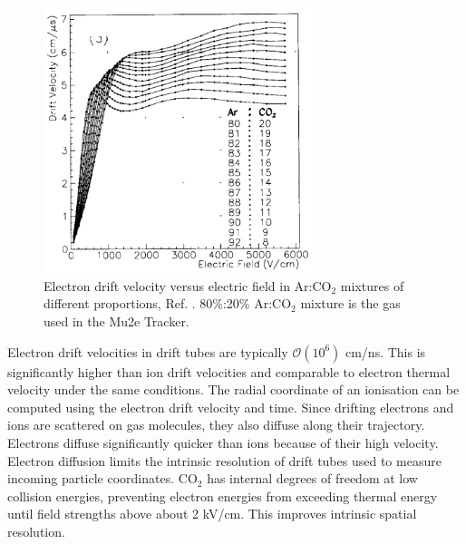 \begin{figure}[!h]
    \centering
    \includegraphics[width =0.7\textwidth]{figures/png/Screenshot_20240330_102206.png}
    \caption{Electron drift velocity versus electric field in Ar:CO$_2$ mixtures of different proportions, Ref. \cite{ZHAO1994485}. 
    80\%:20\% Ar:CO$_2$ mixture is the gas used in the Mu2e Tracker.}
    \label{fig:drift}
\end{figure}
Electron drift velocities in drift tubes are typically $\mathcal{O}(10^6)$ cm/ns.
This is significantly higher than ion drift velocities and comparable to electron thermal velocity under the same conditions. 
The radial coordinate of an ionisation can be computed using the electron drift velocity and time.
Since drifting electrons and ions are scattered on gas molecules, they also diffuse along their trajectory. 
Electrons diffuse significantly quicker than ions because of their high velocity. Electron diffusion limits 
the intrinsic resolution of drift tubes used to measure incoming particle coordinates. CO$_2$ has internal 
degrees of freedom at low collision energies, preventing electron energies from exceeding thermal energy until 
field strengths above about 2 kV/cm. This improves intrinsic spatial resolution.
